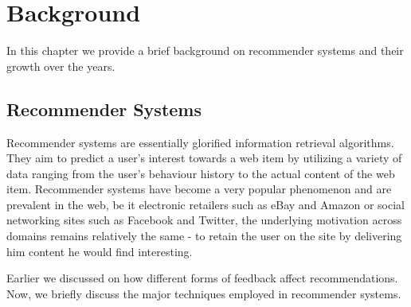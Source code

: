 \chapter{Background}
\label{chap:back}
In this chapter we provide a brief background on recommender systems and their growth over the years.


\section{Recommender Systems}
Recommender systems are essentially glorified information retrieval algorithms. They aim to predict a user's interest towards a web item by utilizing a variety of data ranging from the user's behaviour history to the actual content of the web item. Recommender systems have become a very popular phenomenon and are prevalent in the web, be it electronic retailers such as eBay and Amazon or social networking sites such as Facebook and Twitter, the underlying motivation across domains remains relatively the same - to retain the user on the site by delivering him content he would find interesting.

Earlier we discussed on how different forms of feedback affect recommendations. Now, we briefly discuss the major techniques employed in recommender systems.

